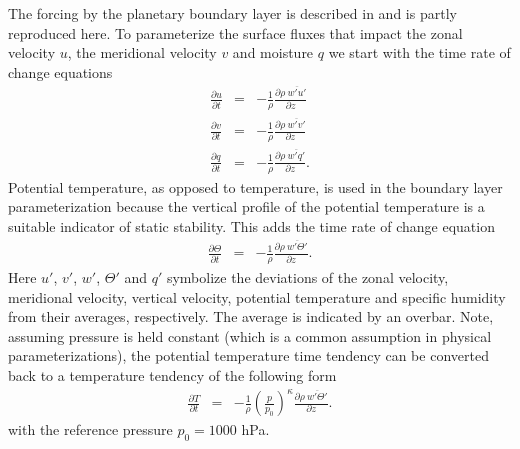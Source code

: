 \documentclass[times,doublespace]{fldauth}
\begin{document}
{\begin{appendix}
The forcing by the planetary boundary layer is described in \cite{reed2012idealized} and is partly reproduced here.  To parameterize the surface fluxes that impact the zonal velocity $u$, the meridional velocity $v$ and moisture $q$ we start with the time rate of change equations
\begin{eqnarray}
\frac{\partial u}{\partial t} &=& - \frac{1}{\rho} \frac{\partial \rho \ \overline{w'u'}}{\partial z} \label{eqturb}  \\
\frac{\partial v}{\partial t} &=& - \frac{1}{\rho} \frac{\partial \rho \ \overline{w'v'}}{\partial z}  \label{eqturb_v} \\
\frac{\partial q}{\partial t} &=& - \frac{1}{\rho} \frac{\partial \rho \ \overline{w'q'}}{\partial z}.  \label{eqturb_last}
\end{eqnarray}  Potential temperature, as opposed to temperature, is used in the boundary layer parameterization because the vertical profile of the potential temperature is a suitable indicator of static stability.  This adds the time rate of change equation
\begin{eqnarray}
\frac{\partial \Theta}{\partial t} &=& - \frac{1}{\rho} \frac{\partial \rho \ \overline{w'\Theta'}}{\partial z}.
\end{eqnarray}  Here $u'$, $v'$, $w'$, $\Theta'$ and $q'$ symbolize the deviations of the zonal velocity, meridional velocity, vertical velocity, potential temperature and specific humidity from their averages, respectively. The average is indicated by an overbar.  Note, assuming pressure is held constant (which is a common assumption in physical parameterizations), the potential temperature time tendency can be converted back to a temperature tendency of the following form
\begin{eqnarray}
\frac{\partial T}{\partial t} &=& - \frac{1}{\rho} \left (\frac{p}{p_0} \right )^{\kappa} \frac{\partial \rho \ \overline{w'\Theta'}}{\partial z}.
\end{eqnarray}
with the reference pressure $p_0 = 1000$ hPa.


\end{appendix}}
\end{document}
